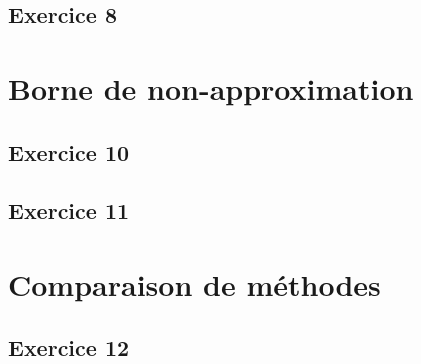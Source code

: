 \subsection{Exercice 8}



%

\section{Borne de non-approximation}

\subsection{Exercice 10}


\subsection{Exercice 11}


\section{Comparaison de méthodes}

\subsection{Exercice 12}


\pagebreak
